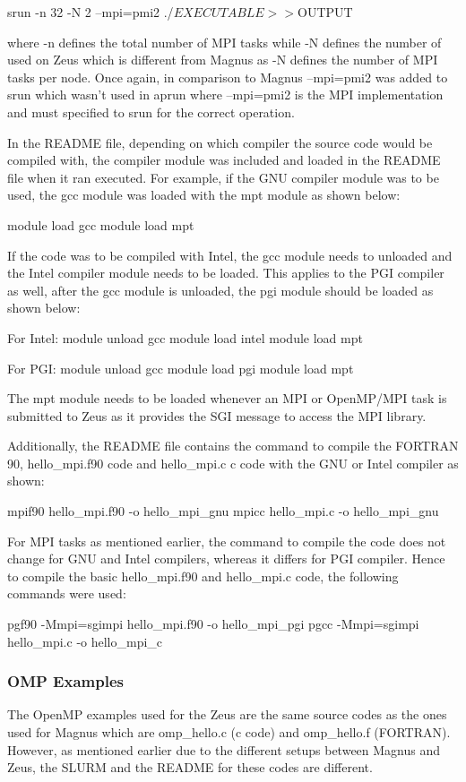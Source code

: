 \documentclass[journal]{IEEEtran}
\begin{document}
srun -n 32 -N 2 --mpi=pmi2 ./$EXECUTABLE >> ${OUTPUT}

where -n defines the total number of MPI tasks while -N defines the number of used on Zeus which is different from Magnus as -N defines the number of
MPI tasks per node. Once again, in comparison to Magnus --mpi=pmi2 was added to srun which wasn't used in aprun where --mpi=pmi2 is the MPI
implementation and must specified to srun for the correct operation.

In the README file, depending on which compiler the source code would be compiled with, the compiler module was included and loaded in the README file 
when it ran executed. For example, if the GNU compiler module was to be used, the gcc module was loaded with the mpt module as shown below:

module load gcc
module load mpt

If the code was to be compiled with Intel, the gcc module needs to unloaded and the Intel compiler module needs to be loaded. This applies to the PGI
compiler as well, after the gcc module is unloaded, the pgi module should be loaded as shown below:

For Intel:
module unload gcc
module load intel
module load mpt

For PGI:
module unload gcc
module load pgi
module load mpt

The mpt module needs to be loaded whenever an MPI or OpenMP/MPI task is submitted to Zeus as it provides the SGI message to access the MPI library.

Additionally, the README file contains the command to compile the FORTRAN 90, hello_mpi.f90 code  and hello_mpi.c c code with the GNU or Intel compiler 
as shown:

mpif90 hello_mpi.f90 -o hello_mpi_gnu
mpicc hello_mpi.c -o hello_mpi_gnu

For MPI tasks as mentioned earlier, the command to compile the code does not change for GNU and Intel compilers, whereas it differs for PGI compiler.
Hence to compile the basic hello_mpi.f90 and hello_mpi.c code, the following commands were used:

pgf90 -Mmpi=sgimpi hello_mpi.f90 -o hello_mpi_pgi
pgcc -Mmpi=sgimpi hello_mpi.c -o hello_mpi_c 
  

\subsubsection{OMP Examples}

The OpenMP examples used for the Zeus are the same source codes as the ones used for Magnus which are omp_hello.c (c code) and omp_hello.f (FORTRAN).
However, as mentioned earlier due to the different setups between Magnus and Zeus, the SLURM and the README for these codes are different.
\end{document}
